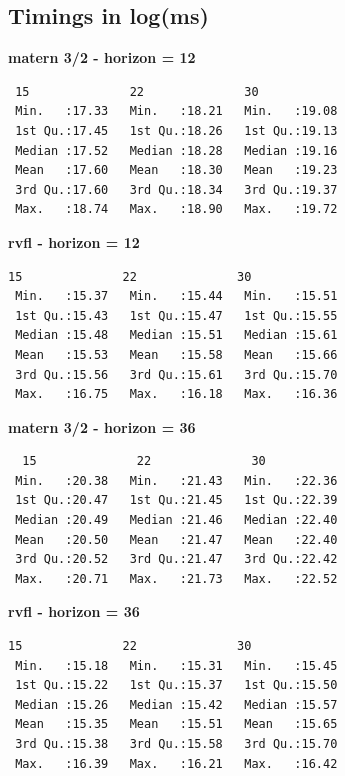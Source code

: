 \newpage

\subsection{Timings in log(ms)}
\label{sec:timings}

\textbf{matern 3/2 - horizon = 12}
\begin{verbatim}
 15              22              30       
 Min.   :17.33   Min.   :18.21   Min.   :19.08  
 1st Qu.:17.45   1st Qu.:18.26   1st Qu.:19.13  
 Median :17.52   Median :18.28   Median :19.16  
 Mean   :17.60   Mean   :18.30   Mean   :19.23  
 3rd Qu.:17.60   3rd Qu.:18.34   3rd Qu.:19.37  
 Max.   :18.74   Max.   :18.90   Max.   :19.72
\end{verbatim}

\textbf{rvfl - horizon = 12}
\begin{verbatim}
15              22              30       
 Min.   :15.37   Min.   :15.44   Min.   :15.51  
 1st Qu.:15.43   1st Qu.:15.47   1st Qu.:15.55  
 Median :15.48   Median :15.51   Median :15.61  
 Mean   :15.53   Mean   :15.58   Mean   :15.66  
 3rd Qu.:15.56   3rd Qu.:15.61   3rd Qu.:15.70  
 Max.   :16.75   Max.   :16.18   Max.   :16.36
\end{verbatim}

\textbf{matern 3/2 - horizon = 36}
\begin{verbatim}
  15              22              30       
 Min.   :20.38   Min.   :21.43   Min.   :22.36  
 1st Qu.:20.47   1st Qu.:21.45   1st Qu.:22.39  
 Median :20.49   Median :21.46   Median :22.40  
 Mean   :20.50   Mean   :21.47   Mean   :22.40  
 3rd Qu.:20.52   3rd Qu.:21.47   3rd Qu.:22.42  
 Max.   :20.71   Max.   :21.73   Max.   :22.52
\end{verbatim}

\textbf{rvfl - horizon = 36}
\begin{verbatim}
15              22              30       
 Min.   :15.18   Min.   :15.31   Min.   :15.45  
 1st Qu.:15.22   1st Qu.:15.37   1st Qu.:15.50  
 Median :15.26   Median :15.42   Median :15.57  
 Mean   :15.35   Mean   :15.51   Mean   :15.65  
 3rd Qu.:15.38   3rd Qu.:15.58   3rd Qu.:15.70  
 Max.   :16.39   Max.   :16.21   Max.   :16.42
\end{verbatim}
